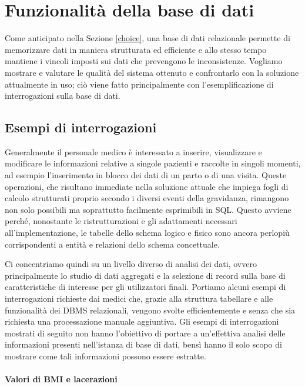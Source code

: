 \chapter{Funzionalità della base di dati}
\label{functionality}

Come anticipato nella Sezione \ref{choice}, una base di dati relazionale permette di memorizzare dati in maniera strutturata ed efficiente e allo stesso tempo mantiene i vincoli imposti sui dati che prevengono le inconsistenze.
Vogliamo mostrare e valutare le qualità del sistema ottenuto e confrontarlo con la soluzione attualmente in uso; ciò viene fatto principalmente con l'esemplificazione di interrogazioni sulla base di dati.

\section{Esempi di interrogazioni} %

Generalmente il personale medico è interessato a inserire, visualizzare e modificare le informazioni relative a singole pazienti e raccolte in singoli momenti, ad esempio l'inserimento in blocco dei dati di un parto o di una visita.
Queste operazioni, che risultano immediate nella soluzione attuale che impiega fogli di calcolo strutturati proprio secondo i diversi eventi della gravidanza, rimangono non solo possibili ma soprattutto facilmente esprimibili in SQL.
Questo avviene perché, nonostante le ristrutturazioni e gli adattamenti necessari all'implementazione, le tabelle dello schema logico e fisico sono ancora perlopiù corrispondenti a entità e relazioni dello schema concettuale.

Ci concentriamo quindi su un livello diverso di analisi dei dati, ovvero principalmente lo studio di dati aggregati e la selezione di record sulla base di caratteristiche di interesse per gli utilizzatori finali.
Portiamo alcuni esempi di interrogazioni richieste dai medici che, grazie alla struttura tabellare e alle funzionalità dei DBMS relazionali, vengono svolte efficientemente e senza che sia richiesta una processazione manuale aggiuntiva.
Gli esempi di interrogazioni mostrati di seguito non hanno l'obiettivo di portare a un'effettiva analisi delle informazioni presenti nell'istanza di base di dati, bensì hanno il solo scopo di mostrare come tali informazioni possono essere estratte.

\subsubsection{Valori di BMI e lacerazioni}

